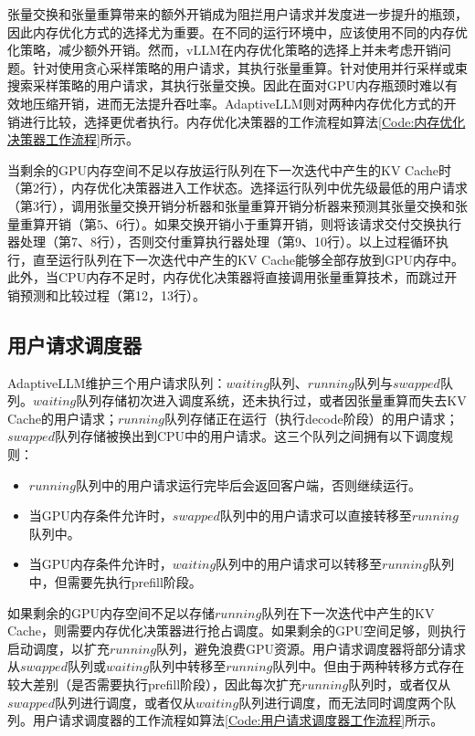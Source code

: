 张量交换和张量重算带来的额外开销成为阻拦用户请求并发度进一步提升的瓶颈，因此内存优化方式的选择尤为重要。在不同的运行环境中，应该使用不同的内存优化策略，减少额外开销。然而，vLLM在内存优化策略的选择上并未考虑开销问题。针对使用贪心采样策略的用户请求，其执行张量重算。针对使用并行采样或束搜索采样策略的用户请求，其执行张量交换。因此在面对GPU内存瓶颈时难以有效地压缩开销，进而无法提升吞吐率。AdaptiveLLM则对两种内存优化方式的开销进行比较，选择更优者执行。内存优化决策器的工作流程如算法\ref{Code:内存优化决策器工作流程}所示。

当剩余的GPU内存空间不足以存放运行队列在下一次迭代中产生的KV Cache时（第2行），内存优化决策器进入工作状态。选择运行队列中优先级最低的用户请求（第3行），调用张量交换开销分析器和张量重算开销分析器来预测其张量交换和张量重算开销（第5、6行）。如果交换开销小于重算开销，则将该请求交付交换执行器处理（第7、8行），否则交付重算执行器处理（第9、10行）。以上过程循环执行，直至运行队列在下一次迭代中产生的KV Cache能够全部存放到GPU内存中。 此外，当CPU内存不足时，内存优化决策器将直接调用张量重算技术，而跳过开销预测和比较过程（第12，13行）。


\subsection{用户请求调度器}

AdaptiveLLM维护三个用户请求队列：$waiting$队列、$running$队列与$swapped$队列。$waiting$队列存储初次进入调度系统，还未执行过，或者因张量重算而失去KV Cache的用户请求；$running$队列存储正在运行（执行decode阶段）的用户请求；$swapped$队列存储被换出到CPU中的用户请求。这三个队列之间拥有以下调度规则：

\begin{itemize}
  \item $running$队列中的用户请求运行完毕后会返回客户端，否则继续运行。
  \item 当GPU内存条件允许时，$swapped$队列中的用户请求可以直接转移至$running$队列中。
  \item 当GPU内存条件允许时，$waiting$队列中的用户请求可以转移至$running$队列中，但需要先执行prefill阶段。
\end{itemize}

如果剩余的GPU内存空间不足以存储$running$队列在下一次迭代中产生的KV Cache，则需要内存优化决策器进行抢占调度。如果剩余的GPU空间足够，则执行启动调度，以扩充$running$队列，避免浪费GPU资源。用户请求调度器将部分请求从$swapped$队列或$waiting$队列中转移至$running$队列中。但由于两种转移方式存在较大差别（是否需要执行prefill阶段），因此每次扩充$running$队列时，或者仅从$swapped$队列进行调度，或者仅从$waiting$队列进行调度，而无法同时调度两个队列。用户请求调度器的工作流程如算法\ref{Code:用户请求调度器工作流程}所示。

